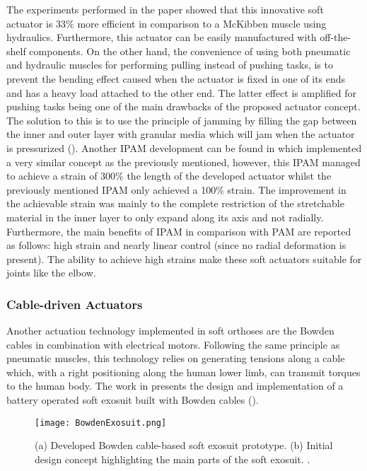The experiments performed in the paper showed that this innovative soft actuator is 33\% more efficient in comparison to a McKibben muscle using hydraulics. Furthermore, this actuator can be easily manufactured with off-the-shelf components. On the other hand, the convenience of using both pneumatic and hydraulic muscles for performing pulling instead of pushing tasks, is to prevent the bending effect caused when the actuator is fixed in one of its ends and has a heavy load attached to the other end. The latter effect is amplified for pushing tasks being one of the main drawbacks of the proposed actuator concept. The solution to this is to use the principle of jamming by filling the gap between the inner and outer layer with granular media which will jam when the actuator is pressurized (). Another IPAM development can be found in \cite{Hawkes2016} which implemented a very similar concept as the previously mentioned, however, this IPAM managed to achieve a strain of 300\% the length of the developed actuator whilst the previously mentioned IPAM only achieved a 100\% strain. The improvement in the achievable strain was mainly to the complete restriction of the stretchable material in the inner layer to only expand along its axis and not radially. Furthermore, the main benefits of IPAM in comparison with PAM are reported as follows: high strain and nearly linear control (since no radial deformation is present). The ability to achieve high strains make these soft actuators suitable for joints like the elbow.

\subsubsection{Cable-driven Actuators} \label{sec:cable-driven}

Another actuation technology implemented in soft orthoses are the Bowden cables in combination with electrical motors. Following the same principle as pneumatic muscles, this technology relies on generating tensions along a cable which, with a right positioning along the human lower limb, can transmit torques to the human body. The work in \cite{asbeck2013biologically} presents the design and implementation of a battery operated soft exosuit built with Bowden cables (). 
\begin{figure}[hbtp!]
    \centering
    \texttt{[image: BowdenExosuit.png]}
    \caption{(a) Developed Bowden cable-based soft exosuit prototype. (b) Initial design concept highlighting the main parts of the soft exosuit. \cite{asbeck2013biologically}. }
    \label{fig:bowden_exo}
\end{figure}

